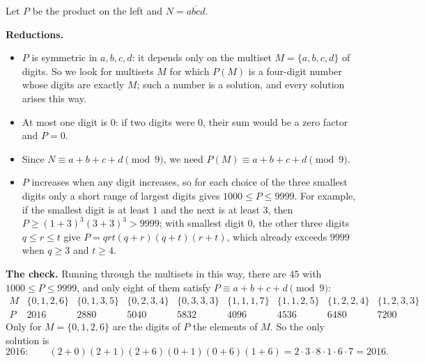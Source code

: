 Let $P$ be the product on the left and $N=\overline{abcd}$.

\textbf{Reductions.}
\begin{itemize}
\item $P$ is symmetric in $a,b,c,d$: it depends only on the multiset $M=\{a,b,c,d\}$ of digits. So we look for multisets $M$ for which $P(M)$ is a four-digit number whose digits are exactly $M$; such a number is a solution, and every solution arises this way.
\item At most one digit is $0$: if two digits were $0$, their sum would be a zero factor and $P=0$.
\item Since $N\equiv a+b+c+d\pmod 9$, we need $P(M)\equiv a+b+c+d\pmod9$.
\item $P$ increases when any digit increases, so for each choice of the three smallest digits only a short range of largest digits gives $1000\le P\le9999$. For example, if the smallest digit is at least $1$ and the next is at least $3$, then $P\ge(1+3)^3(3+3)^3>9999$; with smallest digit $0$, the other three digits $q\le r\le t$ give $P=qrt(q+r)(q+t)(r+t)$, which already exceeds $9999$ when $q\ge3$ and $t\ge4$.
\end{itemize}

\textbf{The check.} Running through the multisets in this way, there are $45$ with $1000\le P\le9999$, and only eight of them satisfy $P\equiv a+b+c+d\pmod9$:
\[
\begin{array}{c|cccccccc}
M&\{0,1,2,6\}&\{0,1,3,5\}&\{0,2,3,4\}&\{0,3,3,3\}&\{1,1,1,7\}&\{1,1,2,5\}&\{1,2,2,4\}&\{1,2,3,3\}\\\hline
P&2016&2880&5040&5832&4096&4536&6480&7200
\end{array}
\]
Only for $M=\{0,1,2,6\}$ are the digits of $P$ the elements of $M$. So the only solution is
\[
\boxed{2016}:\qquad(2+0)(2+1)(2+6)(0+1)(0+6)(1+6)=2\cdot3\cdot8\cdot1\cdot6\cdot7=2016 .
\]
